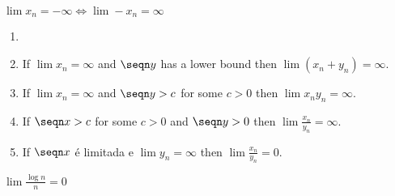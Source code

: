 \begin{fact}
	$\lim x_n = -\infty \iff \lim -x_n = \infty$
\end{fact}

\begin{theorem}
	\begin{enumerate}
		\item[]
		\item If $\lim x_n = \infty$ and $\seqn y$ has a lower bound then $\lim (x_n+y_n) = \infty$.
		\item If $\lim x_n = \infty$ and $\seqn y > c$ for some $c>0$ then $\lim x_n y_n = \infty$.
		\item If $\seqn x > c$ for some $c > 0$ and $\seqn y > 0$ then $\lim \frac{x_n}{y_n} = \infty$.
		\item If $\seqn x$ é limitada e $\lim y_n = \infty$ then $\lim \frac{x_n}{y_n}=0$.
	\end{enumerate}
\end{theorem}

\begin{fact}
	$\lim \frac{\log n }{n} = 0$
\end{fact}